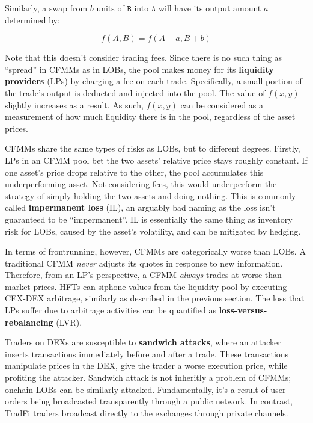\documentclass{article}
\begin{document}
Similarly, a swap from $b$ units of $\mathtt{B}$ into $\mathtt{A}$ will have its output amount $a$ determined by:

\begin{equation}
  f(A, B) = f(A - a, B + b)
\end{equation}

Note that this doesn't consider trading fees. Since there is no such thing as ``spread'' in CFMMs as in LOBs, the pool makes money for its \textbf{liquidity providers} (LPs) by charging a fee on each trade. Specifically, a small portion of the trade's output is deducted and injected into the pool. The value of $f(x, y)$ slightly increases as a result. As such, $f(x, y)$ can be considered as a measurement of how much liquidity there is in the pool, regardless of the asset prices.

CFMMs share the same types of risks as LOBs, but to different degrees. Firstly, LPs in an CFMM pool bet the two assets' relative price stays roughly constant. If one asset's price drops relative to the other, the pool accumulates this underperforming asset. Not considering fees, this would underperform the strategy of simply holding the two assets and doing nothing. This is commonly called \textbf{impermanent loss} (IL), an arguably bad naming as the loss isn't guaranteed to be ``impermanent''. IL is essentially the same thing as inventory risk for LOBs, caused by the asset's volatility, and can be mitigated by hedging.

In terms of frontrunning, however,  CFMMs are categorically worse than LOBs. A traditional CFMM \textit{never} adjusts its quotes in response to new information. Therefore, from an LP's perspective, a CFMM \textit{always} trades at worse-than-market prices. HFTs can siphone values from the liquidity pool by executing CEX-DEX arbitrage, similarly as described in the previous section. The loss that LPs suffer due to arbitrage activities can be quantified as \textbf{loss-versus-rebalancing} (LVR).\supercite{lvr}

Traders on DEXs are susceptible to \textbf{sandwich attacks}, where an attacker inserts transactions immediately before and after a trade. These transactions manipulate prices in the DEX, give the trader a worse execution price, while profiting the attacker. Sandwich attack is not inheritly a problem of CFMMs; onchain LOBs can be similarly attacked. Fundamentally, it's a result of user orders being broadcasted transparently through a public network. In contrast, TradFi traders broadcast directly to the exchanges through private channels.
\end{document}
